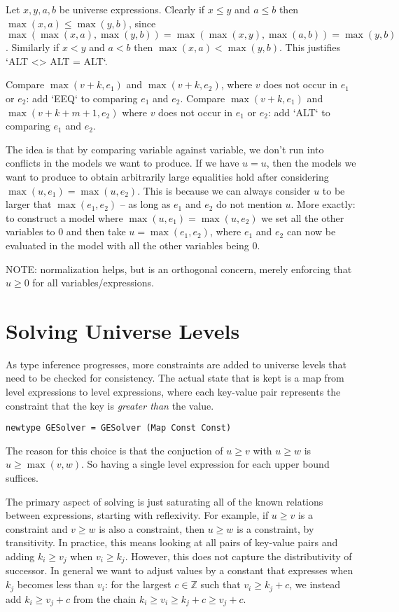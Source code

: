 \documentclass[11pt, twoside, reqno]{book}
\begin{document}
Let $x, y, a, b$ be universe expressions.
Clearly if $x \le y$ and $a \le b$ then $\max(x,a) \le \max(y,b)$, since $\max(\max(x,a),\max(y,b)) = \max(\max(x,y),\max(a,b)) = \max(y,b)$.
Similarly if $x < y$ and $a < b$ then $\max(x,a) < \max(y,b)$.
This justifies \inHS`ALT <> ALT = ALT`.

Compare $\max(v+k, e_1)$ and $\max(v+k, e_2)$, where $v$ does not occur in $e_1$ or $e_2$: add \inHS`EEQ` to comparing $e_1$ and $e_2$.
Compare $\max(v+k, e_1)$ and $\max(v+k+m+1, e_2)$  where $v$ does not occur in $e_1$ or $e_2$: add \inHS`ALT` to comparing $e_1$ and $e_2$.


The idea is that by comparing variable against variable, we don't run into conflicts in the models we want to produce.
If we have $u = u$, then the models we want to produce to obtain arbitrarily large equalities hold after considering $\max(u, e_1) = \max(u, e_2)$.
This is because we can always consider $u$ to be larger that $\max(e_1, e_2)$ -- as long as $e_1$ and $e_2$ do not mention $u$.
More exactly: to construct a model where $\max(u, e_1) = \max(u, e_2)$ we set all the other variables to $0$ and then take $u = \max(e_1, e_2)$, where $e_1$ and $e_2$ can now be evaluated in the model with all the other variables being $0$.

NOTE: normalization helps, but is an orthogonal concern, merely enforcing that $u \ge 0$ for all variables/expressions.


\section{Solving Universe Levels}
\label{solv-uni-lvl}

As type inference progresses, more constraints are added to universe levels that need to be checked for consistency.
The actual state that is kept is a map from level expressions to level expressions, where each key-value pair represents the constraint that the key is \emph{greater than} the value.

\begin{verbatim}
newtype GESolver = GESolver (Map Const Const)
\end{verbatim}

The reason for this choice is that the conjuction of $u \ge v$ with $u \ge w$ is $u \ge \max(v, w)$.
So having a single level expression for each upper bound suffices.

The primary aspect of solving is just saturating all of the known relations between expressions, starting with reflexivity.
For example, if $u \ge v$ is a constraint and $v \ge w$ is also a constraint, then $u \ge w$ is a constraint, by transitivity.
In practice, this means looking at all pairs of key-value pairs and adding $k_i \ge v_j$ when $v_i \ge k_j$.
However, this does not capture the distributivity of successor.
In general we want to adjust values by a constant that expresses when $k_j$ becomes less than $v_i$: for the largest $c \in \mathbb{Z}$ such that $v_i \ge k_j + c$, we instead add $k_i \ge v_j + c$ from the chain $k_i \ge v_i \ge k_j + c \ge v_j + c$.
\end{document}
